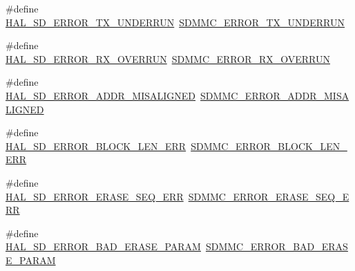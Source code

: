 \begin{DoxyCompactItemize}
\item 
\#define \mbox{\hyperlink{group___s_d___exported___constansts___group1_ga3ad1dc545a461da4f51d1cbb606e590f}{H\+A\+L\+\_\+\+S\+D\+\_\+\+E\+R\+R\+O\+R\+\_\+\+T\+X\+\_\+\+U\+N\+D\+E\+R\+R\+UN}}~\mbox{\hyperlink{group___s_d_m_m_c___l_l___exported___constants_ga3f6e41553c567de7a6cdd411541f3095}{S\+D\+M\+M\+C\+\_\+\+E\+R\+R\+O\+R\+\_\+\+T\+X\+\_\+\+U\+N\+D\+E\+R\+R\+UN}}
\item 
\#define \mbox{\hyperlink{group___s_d___exported___constansts___group1_gab96a3612ea5f041a8edd2a48ecf714be}{H\+A\+L\+\_\+\+S\+D\+\_\+\+E\+R\+R\+O\+R\+\_\+\+R\+X\+\_\+\+O\+V\+E\+R\+R\+UN}}~\mbox{\hyperlink{group___s_d_m_m_c___l_l___exported___constants_ga644d8cdeaa0f51fd52485d1eef9205c8}{S\+D\+M\+M\+C\+\_\+\+E\+R\+R\+O\+R\+\_\+\+R\+X\+\_\+\+O\+V\+E\+R\+R\+UN}}
\item 
\#define \mbox{\hyperlink{group___s_d___exported___constansts___group1_ga43d7de63d0e4b974adce4679d586ab1d}{H\+A\+L\+\_\+\+S\+D\+\_\+\+E\+R\+R\+O\+R\+\_\+\+A\+D\+D\+R\+\_\+\+M\+I\+S\+A\+L\+I\+G\+N\+ED}}~\mbox{\hyperlink{group___s_d_m_m_c___l_l___exported___constants_gaebcb686c7ca19de6ac32a40107b265f5}{S\+D\+M\+M\+C\+\_\+\+E\+R\+R\+O\+R\+\_\+\+A\+D\+D\+R\+\_\+\+M\+I\+S\+A\+L\+I\+G\+N\+ED}}
\item 
\#define \mbox{\hyperlink{group___s_d___exported___constansts___group1_ga90f7c7efc64061d73947bdbe38e1dc4b}{H\+A\+L\+\_\+\+S\+D\+\_\+\+E\+R\+R\+O\+R\+\_\+\+B\+L\+O\+C\+K\+\_\+\+L\+E\+N\+\_\+\+E\+RR}}~\mbox{\hyperlink{group___s_d_m_m_c___l_l___exported___constants_ga45e1b7e2df402602146fe4e362666c1e}{S\+D\+M\+M\+C\+\_\+\+E\+R\+R\+O\+R\+\_\+\+B\+L\+O\+C\+K\+\_\+\+L\+E\+N\+\_\+\+E\+RR}}
\item 
\#define \mbox{\hyperlink{group___s_d___exported___constansts___group1_ga24b684466465a4dbc777baf3b0908198}{H\+A\+L\+\_\+\+S\+D\+\_\+\+E\+R\+R\+O\+R\+\_\+\+E\+R\+A\+S\+E\+\_\+\+S\+E\+Q\+\_\+\+E\+RR}}~\mbox{\hyperlink{group___s_d_m_m_c___l_l___exported___constants_ga23fee50a8501571d2d72e761dd6f42c5}{S\+D\+M\+M\+C\+\_\+\+E\+R\+R\+O\+R\+\_\+\+E\+R\+A\+S\+E\+\_\+\+S\+E\+Q\+\_\+\+E\+RR}}
\item 
\#define \mbox{\hyperlink{group___s_d___exported___constansts___group1_ga89cf076092f9e43f96f0ecfb1d9bcbf7}{H\+A\+L\+\_\+\+S\+D\+\_\+\+E\+R\+R\+O\+R\+\_\+\+B\+A\+D\+\_\+\+E\+R\+A\+S\+E\+\_\+\+P\+A\+R\+AM}}~\mbox{\hyperlink{group___s_d_m_m_c___l_l___exported___constants_ga90484f34f4b2a9c9fcaffb37a2185e3d}{S\+D\+M\+M\+C\+\_\+\+E\+R\+R\+O\+R\+\_\+\+B\+A\+D\+\_\+\+E\+R\+A\+S\+E\+\_\+\+P\+A\+R\+AM}}
\item 

\end{DoxyCompactItemize}
